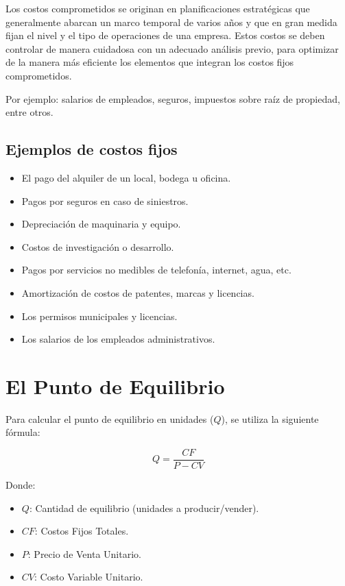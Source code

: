 \documentclass[../main]{subfiles}
\begin{document}
Los costos comprometidos se originan en planificaciones estratégicas
que generalmente abarcan un marco temporal de varios años y que en
gran medida fijan el nivel y el tipo de operaciones de una empresa.
Estos costos se deben controlar de manera cuidadosa con un adecuado
análisis previo, para optimizar de la manera más eficiente
los elementos que integran los costos fijos comprometidos.

Por ejemplo: salarios de empleados, seguros, impuestos sobre raíz de
propiedad, entre otros.

\subsection{Ejemplos de costos fijos}
\begin{itemize}
  \item  El pago del alquiler de un local, bodega u oficina.
  \item Pagos por seguros en caso de siniestros.
  \item Depreciación de maquinaria y equipo.
  \item Costos de investigación o desarrollo.
  \item Pagos por servicios no medibles de telefonía, internet, agua, etc.
  \item Amortización de costos de patentes, marcas y licencias.
  \item Los permisos municipales y licencias.
  \item Los salarios de los empleados administrativos.
\end{itemize}

\newpage
\section{El Punto de Equilibrio}

Para calcular el punto de equilibrio en unidades ($Q$), se utiliza la siguiente fórmula:

\begin{equation}
  Q = \frac{CF}{P - CV}
\end{equation}

Donde:
\begin{itemize}
  \item \textbf{$Q$}: Cantidad de equilibrio (unidades a producir/vender).
  \item \textbf{$CF$}: Costos Fijos Totales.
  \item \textbf{$P$}: Precio de Venta Unitario.
  \item \textbf{$CV$}: Costo Variable Unitario.
\end{itemize}
\end{document}
